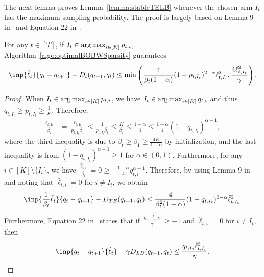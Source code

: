 The next lemma proves Lemma~\ref{lemma:stableTELB} whenever the chosen arm $I_t$ has the maximum sampling probability. The proof is largely based on Lemma 9 in~\cite{ItoCOLT2024} and Equation 22 in~\cite{Tsuchiya2023stabilitypenaltyadaptive}.
\begin{lemma}
    For any $t \in [T]$, if $I_t \in \operatorname*{arg\,max}_{i \in [K]}p_{t,i}$, Algorithm~\ref{algo:optimalBOBWSparsity} guarantees
    \begin{align}
        \inp{\hat{\ell}_t}{q_{t}  - q_{t+1}} - D_t(q_{t+1}, q_t) \leq \min\left(\frac{4}{\beta_t(1-\alpha)} (1-p_{t, I_t})^{2-\alpha}\hat{\ell}_{t,I_t}^2, \frac{4\ell_{t,I_t}^2}{\gamma} \right).
    \end{align}
    \label{lemma:stableItMax}
\end{lemma}
\begin{proof}
    When $I_t \in \operatorname*{arg\,max}_{i \in [K]}p_{t,i}$, we have $I_t \in \operatorname*{arg\,max}_{i \in [K]}q_{t,i}$ and thus $q_{t,I_t} \geq p_{t,I_t} \geq \frac{1}{K}$. Therefore, 
    \begin{align}
        \frac{\hat{\ell}_{t,I_t}}{\beta_t} &= \frac{\ell_{t,I_t}}{p_{t,I_t}\beta_t}
        \leq \frac{1}{p_{t,I_t}\beta_t}
        \leq \frac{K}{\beta_t}
        \leq \frac{1-\alpha}{4}
        \leq \frac{1-\alpha}{4}(1-q_{t,I_t})^{\alpha - 1},
    \end{align}
    where the third inequality is due to $\beta_t \geq \beta_1 \geq \frac{4K}{1-\alpha}$ by initialization, and the last inequality is from $(1-q_{t,I_t})^{\alpha - 1} \geq 1$ for $\alpha \in (0,1)$. Furthermore, for any $i \in [K] \setminus \{I_t\}$, we have $\frac{\hat{\ell}_{t,i}}{\beta_t} = 0 \geq -\frac{1-\alpha}{4}q_{t,i}^{\alpha-1}$. Therefore, by using Lemma 9 in~\cite{ItoCOLT2024} and noting that $\hat{\ell}_{t,i} = 0$ for $i \neq I_t$, we obtain 
    \begin{align}
        \inp{\frac{1}{\beta_t}\hat{\ell}_t}{q_{t} - q_{t+1}} - D_{TE}(q_{t+1}, q_t) \leq \frac{4}{\beta_t^2(1-\alpha)} (1-q_{t,I_t})^{2-\alpha}\hat{\ell}_{t,I_t}^2.
        \label{eq:invokeLemma9ItoCOLT2024}
    \end{align}
    Furthermore, Equation 22 in~\cite{Tsuchiya2023stabilitypenaltyadaptive} states that if $\frac{q_{t,I_t}\hat{\ell}_{t,I_t}}{\gamma} \geq -1$ and $\hat{\ell}_{t,i} = 0$ for $i \neq I_t$, then
    \begin{align}
        \inp{q_t - q_{t+1}}{\hat{\ell}_t} - \gamma D_{LB}(q_{t+1}, q_t) \leq \frac{q_{t,I_t}\hat{\ell}_{t,I_t}^2}{\gamma}.
        \label{eq:invokeEq22Tsuchiya2023}
    \end{align}

\end{proof}
